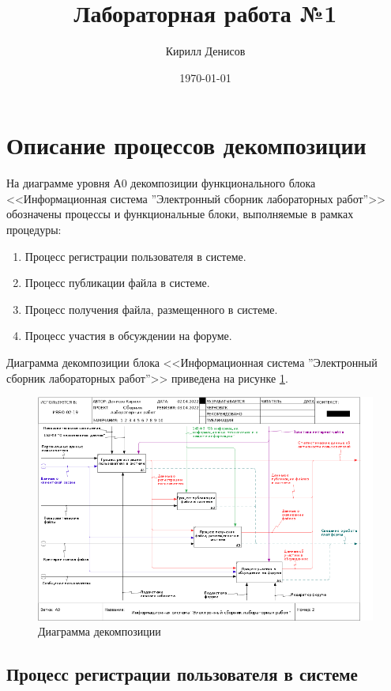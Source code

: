 \documentclass[a4paper,14pt]{extarticle}
\author{Кирилл Денисов}
\title{Лабораторная работа №1}
\date{\today}
\newcommand{\pathToCommonFolder}{/home/denilai/Documents/repos/latex/Common}
\begin{document}
	\thispagestyle{empty}
	
	\newpage
	\newpage
	
\normalsize

\section{Описание процессов декомпозиции}
На диаграмме уровня А0 декомпозиции функционального блока
<<Информационная система ''Электронный сборник лабораторных работ''>> обозначены процессы и функциональные блоки,
выполняемые в рамках процедуры:

\begin{enumerate}
	\item Процесс регистрации пользователя в системе.
	\item 	Процесс публикации файла в системе.
	\item Процесс получения файла, размещенного в системе.
	\item Процесс участия в обсуждении на форуме.
\end{enumerate}

Диаграмма декомпозиции блока <<Информационная система ''Электронный сборник лабораторных работ''>> приведена на рисунке \ref{fig:02a0}.

\begin{figure}
	\centering
	\includegraphics[width=0.8\linewidth]{images/ramus/02_A0}
	\caption{Диаграмма декомпозиции}
	\label{fig:02a0}
\end{figure}


\subsection{Процесс регистрации пользователя в системе}
\end{document}
